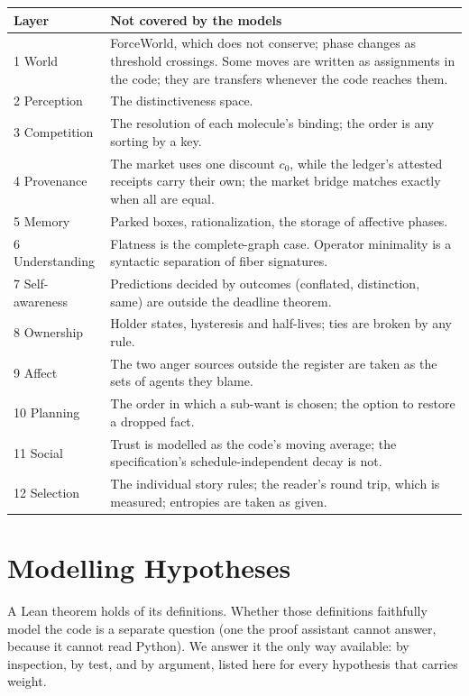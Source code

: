 \documentclass[11pt]{article}
\theoremstyle{remark}
\begin{document}
\begin{longtable}{@{}p{2.8cm}p{12cm}@{}}
\toprule
Layer & Not covered by the models \\
\midrule
\endhead
1 World & ForceWorld, which does not conserve; phase changes as threshold crossings. Some
moves are written as assignments in the code; they are transfers whenever the code reaches
them. \\
2 Perception & The distinctiveness space. \\
3 Competition & The resolution of each molecule's binding; the order is any sorting by a
key. \\
4 Provenance & The market uses one discount $c_0$, while the ledger's attested receipts
carry their own; the market bridge matches exactly when all are equal. \\
5 Memory & Parked boxes, rationalization, the storage of affective phases. \\
6 Understanding & Flatness is the complete-graph case. Operator minimality is a syntactic
separation of fiber signatures. \\
7 Self-awareness & Predictions decided by outcomes (conflated, distinction, same) are
outside the deadline theorem. \\
8 Ownership & Holder states, hysteresis and half-lives; ties are broken by any rule. \\
9 Affect & The two anger sources outside the register are taken as the sets of agents they
blame. \\
10 Planning & The order in which a sub-want is chosen; the option to restore a dropped
fact. \\
11 Social & Trust is modelled as the code's moving average; the specification's
schedule-independent decay is not. \\
12 Selection & The individual story rules; the reader's round trip, which is measured;
entropies are taken as given. \\
\bottomrule
\end{longtable}

\section{Modelling Hypotheses}
\label{app:hypotheses}

A Lean theorem holds of its definitions. Whether those definitions faithfully model the
code is a separate question (one the proof assistant cannot answer, because it cannot read
Python). We answer it the only way available: by inspection, by test, and by argument,
listed here for every hypothesis that carries weight.
\end{document}

